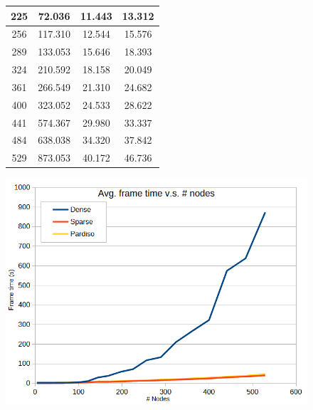 \documentclass[letterpaper, 10 pt, conference]{ieeeconf}  %
\begin{document}
\begin{figure}
\begin{minipage}[b]{.45\linewidth}
\begin{center}
\begin{tabular}{|c|c|c|c|}
                                225                  & 72.036         & 11.443          & 13.312           \\ \hline
                                256                  & 117.310        & 12.544          & 15.576           \\ \hline
                                289                  & 133.053        & 15.646          & 18.393           \\ \hline
                                324                  & 210.592        & 18.158          & 20.049           \\ \hline
                                361                  & 266.549        & 21.310          & 24.682           \\ \hline
                                400                  & 323.052        & 24.533          & 28.622           \\ \hline
                                441                  & 574.367        & 29.980          & 33.337           \\ \hline
                                484                  & 638.038        & 34.320          & 37.842           \\ \hline
                                529                  & 873.053        & 40.172          & 46.736           \\ \hline
                                \end{tabular}
                \end{center}
                 \label{fig:frametimes}
        \end{minipage}\hfill
        \begin{minipage}[b]{.45\linewidth}
                \centering
                \includegraphics[width=1.0\linewidth]{frametimes.PNG}
                 \label{fig:frametimesgraph}
        \end{minipage}
\end{figure}
\end{document}
